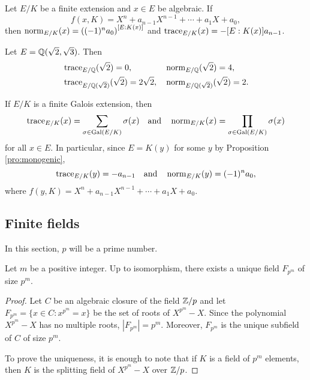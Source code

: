 \begin{exercise}
        Let $E/K$ be a finite extension and
        $x\in E$ be algebraic. If
        \[
        f(x,K)=X^n+a_{n-1}X^{n-1}+\cdots+a_1X+a_0,
        \]
        then 
        $\operatorname{norm}_{E/K}(x)=\left((-1)^na_0\right)^{[E:K(x)]}$ and 
        $\operatorname{trace}_{E/K}(x)=-[E:K(x)]a_{n-1}$. 
\end{exercise}

\begin{example}
    Let $E=\mathbb{Q}(\sqrt{2},\sqrt{3})$. Then 
    \begin{align*}
    &\operatorname{trace}_{E/\mathbb{Q}}(\sqrt{2})=0,
    &&
    \operatorname{norm}_{E/\mathbb{Q}}(\sqrt{2})=4,\\
    &\operatorname{trace}_{E/\mathbb{Q}(\sqrt{2})}(\sqrt{2})=2\sqrt{2},
    &&\operatorname{norm}_{E/\mathbb{Q}(\sqrt{2})}(\sqrt{2})=2.    
    \end{align*}
\end{example}

\begin{example}
    If $E/K$ is a finite Galois extension, then 
    \[
    \operatorname{trace}_{E/K}(x)=\sum_{\sigma\in\operatorname{Gal}(E/K)}\sigma(x)
    \quad\text{and}\quad
    \operatorname{norm}_{E/K}(x)=\prod_{\sigma\in\operatorname{Gal}(E/K)}\sigma(x)
    \]
    for all $x\in E$. In particular, since $E=K(y)$ for some
    $y$ by Proposition \ref{pro:monogenic}, 
    \[
    \operatorname{trace}_{E/K}(y)=-a_{n-1}
    \quad\text{and}\quad
    \operatorname{norm}_{E/K}(y)=(-1)^na_0,
    \]
    where
    $f(y,K)=X^n+a_{n-1}X^{n-1}+\cdots+a_1X+a_0$.
\end{example}        

\subsection{Finite fields}

In this section, $p$ will be a prime number. 

\begin{proposition}
    Let $m$ be a positive integer. 
    Up to isomorphism, there exists a unique 
    field $F_{p^m}$ of size $p^m$. 
\end{proposition}

\begin{proof}
    Let $C$ be an algebraic closure of the field $\mathbb{Z}/p$ and 
    let $F_{p^m}=\{x\in C:x^{p^m}=x\}$ be the set of roots of $X^{p^m}-X$. Since 
    the polynomial $X^{p^m}-X$ has no multiple roots, $|F_{p^m}|=p^m$. Moreover, 
    $F_{p^m}$ is the unique subfield of $C$ of size $p^m$. 
    
    To prove the uniqueness, it is enough to note that 
    if $K$ is a field of $p^m$ elements, then
    $K$ is the splitting field of $X^{p^m}-X$ over $\mathbb{Z}/p$.  
\end{proof}

